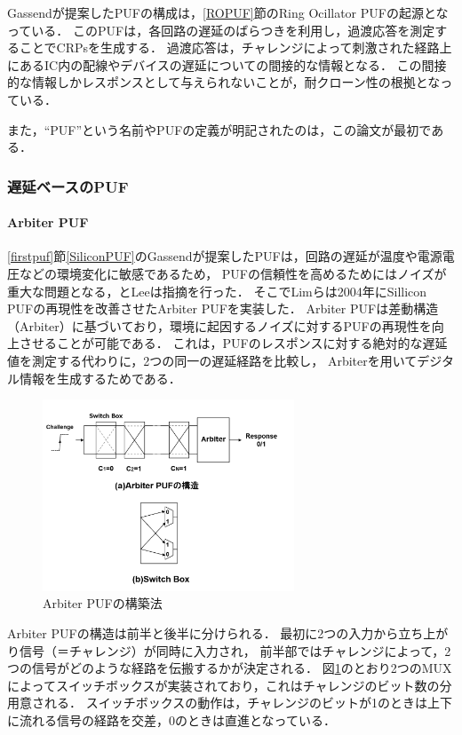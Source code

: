 \documentclass[technicalreport]{ieicej} %
\begin{document}
Gassendが提案したPUF\cite{gassend1}の構成は，\ref{ROPUF}節のRing Ocillator PUFの起源となっている．
このPUFは，各回路の遅延のばらつきを利用し，過渡応答を測定することでCRPsを生成する．
過渡応答は，チャレンジによって刺激された経路上にあるIC内の配線やデバイスの遅延についての間接的な情報となる．
この間接的な情報しかレスポンスとして与えられないことが，耐クローン性の根拠となっている．

また，“PUF”という名前やPUFの定義が明記されたのは，この論文が最初である．

\subsubsection{遅延ベースのPUF}
\label{delaypuf}
\paragraph{Arbiter PUF}
\label{apuf}
\ref{firstpuf}節\ref{SiliconPUF}のGassendが提案したPUFは，回路の遅延が温度や電源電圧などの環境変化に敏感であるため，
PUFの信頼性を高めるためにはノイズが重大な問題となる，とLeeは指摘を行った\cite{lee}．
そこでLimらは2004年にSillicon PUFの再現性を改善させたArbiter PUF\cite{lim}を実装した．
Arbiter PUFは差動構造（Arbiter）に基づいており，環境に起因するノイズに対するPUFの再現性を向上させることが可能である．
これは，PUFのレスポンスに対する絶対的な遅延値を測定する代わりに，2つの同一の遅延経路を比較し，
Arbiterを用いてデジタル情報を生成するためである．

\begin{figure}[tb]
  \begin{center}
    \includegraphics[width=75mm]{Apuf.png}
  \end{center}
  \caption{Arbiter PUFの構築法}
  \label{APUF}
\end{figure}
Arbiter PUFの構造は前半と後半に分けられる．
最初に2つの入力から立ち上がり信号（＝チャレンジ）が同時に入力され，
前半部ではチャレンジによって，2つの信号がどのような経路を伝搬するかが決定される．
図\ref{APUF}のとおり2つのMUXによってスイッチボックスが実装されており，これはチャレンジのビット数の分用意される．
スイッチボックスの動作は，チャレンジのビットが1のときは上下に流れる信号の経路を交差，0のときは直進となっている．
\end{document}
